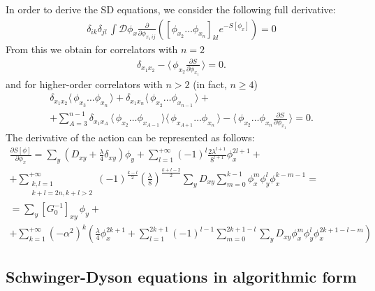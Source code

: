 \documentclass[12pt]{article}
\newcommand{\lr}[1]{ \left( #1 \right) }
\newcommand{\lrs}[1]{ \left[ #1 \right] }
\newcommand{\vev}[1]{ \langle \, #1 \, \rangle }
\begin{document}
 In order to derive the SD equations, we consider the following full derivative:
\begin{eqnarray}
\label{sd_eqs0}
 \delta_{ik} \delta_{jl} \, \int \mathcal{D}\phi_x \frac{\partial}{\partial \phi_{x_1 \, ij}}
 \lr{
 \lrs{\phi_{x_2} \ldots \phi_{x_n}}_{kl} e^{-S\lrs{\phi_x}}
 } = 0
\end{eqnarray}
From this we obtain for correlators with $n = 2$
\begin{eqnarray}
\label{sd_eqs_G2_coord}
 \delta_{x_1 x_2} - \vev{\phi_{x_2} \frac{\partial S}{\partial \phi_{x_1}} } = 0 .
\end{eqnarray}
and for higher-order correlators with $n > 2$ (in fact, $n \geq 4$)
\begin{eqnarray}
\label{sd_eqs_Gn_coord}
 \delta_{x_1 x_2} \vev{\phi_{x_3} \ldots \phi_{x_n}}
 +
 \delta_{x_1 x_n} \vev{\phi_{x_2} \ldots \phi_{x_{n-1}}}
 + \nonumber \\ +
 \sum\limits_{A=3}^{n-1} \delta_{x_1 x_A} \,
 \vev{\phi_{x_2} \ldots \phi_{x_{A-1}}}
 \vev{\phi_{x_{A+1}} \ldots \phi_{x_n}}
 -
 \vev{\phi_{x_2} \ldots \phi_{x_n} \frac{\partial S}{\partial \phi_{x_1}} } = 0 .
\end{eqnarray}
The derivative of the action can be represented as follows:
\begin{eqnarray}
\label{dSdphi_coord}
 \frac{\partial S\lrs{\phi}}{\partial \phi_x}
 =
 \sum\limits_{y} \lr{D_{xy} + \frac{\lambda}{4} \delta_{x y}} \phi_y
 +
 \sum\limits_{l=1}^{+\infty} \lr{-1}^l \frac{2 \lambda^{l+1}}{8^{l+1}} \phi_x^{2 l + 1}
 + \nonumber \\ +
 \sum\limits_{\substack{k,l=1\\k+l=2 n,k+l>2}}^{+\infty}
 \lr{-1}^{\frac{k-l}{2}} \lr{\frac{\lambda}{8}}^{\frac{k+l-2}{2}}
 \sum\limits_y D_{x y}
 \sum\limits_{m=0}^{k-1}
 \phi_x^m \phi_y^l \phi_x^{k-m-1}
 = \nonumber \\ =
 \sum\limits_y \lrs{G_0^{-1}}_{x y} \, \phi_y
 + \nonumber \\ +
 \sum\limits_{k=1}^{+\infty} \lr{-\alpha^2}^k
 \lr{
  \frac{\lambda}{4} \phi_x^{2 k + 1}
  +
  \sum\limits_{l=1}^{2 k + 1} \lr{-1}^{l-1}
  \sum\limits_{m=0}^{2 k + 1 - l}
  \sum\limits_y D_{x y}
  \phi_x^m \phi_y^l \phi_x^{2 k + 1 - l - m}
 }
\end{eqnarray}

\subsection{Schwinger-Dyson equations in algorithmic form}
\label{subsec:sd_coord_alg}
\end{document}

